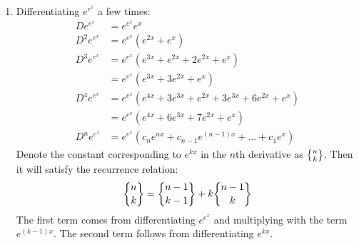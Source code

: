 \begin{solution}
    \begin{enumerate}[label=(\alph*)]
        \item Differentiating $e^{e^x}$ a few times:
        \begin{align*}
            De^{e^x} &= e^{e^x}e^x \\
            D^2e^{e^x} &= e^{e^x}(e^{2x} + e^x) \\
            D^3e^{e^x} &= e^{e^x}(e^{3x} + e^{2x} + 2e^{2x} + e^x) \\
            &= e^{e^x}(e^{3x} + 3e^{2x} + e^x) \\
            D^4e^{e^x} &= e^{e^x}(e^{4x} + 3e^{3x} + e^{2x} + 3e^{3x} + 6e^{2x} + e^x) \\
            &= e^{e^x}(e^{4x} + 6e^{3x} + 7e^{2x} + e^x) \\
            D^ne^{e^x} &= e^{e^x}(c_ne^{nx} + c_{n-1}e^{(n-1)x} + \ldots + c_{1}e^{x})
        \end{align*}
        Denote the constant corresponding to $e^{kx}$ in the $n$th derivative as $\stirlingSnd{n}{k}$. Then it will satisfy the recurrence relation:
        \[
            \stirlingSnd{n}{k} = \stirlingSnd{n-1}{k-1} + k \stirlingSnd{n-1}{k}
        \]
        The first term comes from differentiating $e^{e^x}$ and multiplying with the term $e^{(k-1)x}$. The second term follows from differentiating $e^{kx}$.


\end{enumerate}
\end{solution}

